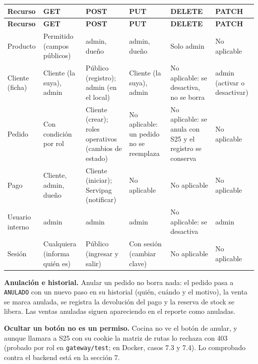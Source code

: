 {\footnotesize
\setlength{\tabcolsep}{3pt}\renewcommand{\arraystretch}{1.15}
\begin{longtable}{|>{\raggedright\arraybackslash}p{}|>{\raggedright\arraybackslash}p{}|>{\raggedright\arraybackslash}p{}|>{\raggedright\arraybackslash}p{}|>{\raggedright\arraybackslash}p{}|>{\raggedright\arraybackslash}p{}|}
\hline
\textbf{Recurso} & \textbf{GET} & \textbf{POST} & \textbf{PUT} & \textbf{DELETE} & \textbf{PATCH} \\ \hline
\endfirsthead
\hline
\textbf{Recurso} & \textbf{GET} & \textbf{POST} & \textbf{PUT} & \textbf{DELETE} & \textbf{PATCH} \\ \hline
\endhead
Producto & Permitido (campos públicos) & admin, dueño & admin, dueño & Solo admin & No aplicable \\ \hline
Cliente (ficha) & Cliente (la suya), admin & Público (registro); admin (en el local) & Cliente (la suya), admin & No aplicable: se desactiva, no se borra & admin (activar o desactivar) \\ \hline
Pedido & Con condición por rol & Cliente (crear); roles operativos (cambios de estado) & No aplicable: un pedido no se reemplaza & No aplicable: se anula con S25 y el registro se conserva & No aplicable \\ \hline
Pago & Cliente, admin, dueño & Cliente (iniciar); Servipag (notificar) & No aplicable & No aplicable & No aplicable \\ \hline
Usuario interno & admin & admin & admin & No aplicable: se desactiva & admin \\ \hline
Sesión & Cualquiera (informa quién es) & Público (ingresar y salir) & Con sesión (cambiar clave) & No aplicable & No aplicable \\ \hline
\end{longtable}
}

\textbf{Anulación e historial.} Anular un pedido no borra nada: el pedido pasa a \texttt{ANULADO} con un nuevo paso en su historial (quién, cuándo y el motivo), la venta se marca anulada, se registra la devolución del pago y la reserva de stock se libera. Las ventas anuladas siguen apareciendo en el reporte como anuladas.


\textbf{Ocultar un botón no es un permiso.} Cocina no ve el botón de anular, y aunque llamara a S25 con su cookie la matriz de rutas lo rechaza con 403 (probado por rol en \texttt{gateway/\allowbreak{}test}; en Docker, casos 7.3 y 7.4). Lo comprobado contra el backend está en la sección 7.


